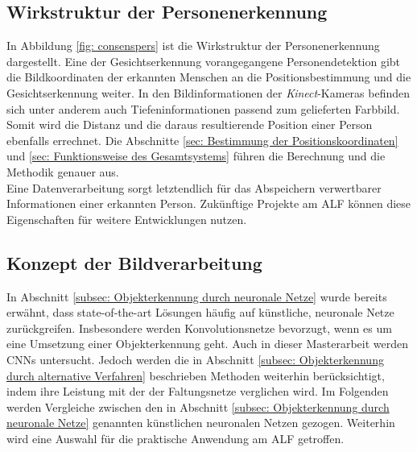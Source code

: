 	\subsection{Wirkstruktur der Personenerkennung}
	\label{subsec: Wirkstrukur Personenerkennung}
	In Abbildung \ref{fig: consenspers} ist die Wirkstruktur der Personenerkennung dargestellt. Eine der Gesichtserkennung vorangegangene Personendetektion gibt die Bildkoordinaten der erkannten Menschen an die Positionsbestimmung und die Gesichtserkennung weiter. In den Bildinformationen der \textit{Kinect}-Kameras befinden sich unter anderem auch Tiefeninformationen passend zum gelieferten Farbbild. Somit wird die Distanz und die daraus resultierende Position einer Person ebenfalls errechnet. Die Abschnitte \ref{sec: Bestimmung der Positionskoordinaten} und \ref{sec: Funktionsweise des Gesamtsystems} führen die Berechnung und die Methodik genauer aus.\\
		
	
	

		
	Eine Datenverarbeitung sorgt letztendlich für das Abspeichern verwertbarer Informationen einer erkannten Person. Zukünftige Projekte am ALF können diese Eigenschaften für weitere Entwicklungen nutzen.\\   
		
	\subsection{Konzept der Bildverarbeitung}
	\label{subsec: Auswahl und Training der verwendeten neuronalen Netze}
		
	In Abschnitt \ref{subsec: Objekterkennung durch neuronale Netze} wurde bereits erwähnt, dass state-of-the-art Lösungen häufig auf künstliche, neuronale Netze zurückgreifen. Insbesondere werden Konvolutionsnetze bevorzugt, wenn es um eine Umsetzung einer Objekterkennung geht. Auch in dieser Masterarbeit werden CNNs untersucht. Jedoch werden die in Abschnitt \ref{subsec: Objekterkennung durch alternative Verfahren} beschrieben Methoden weiterhin berücksichtigt, indem ihre Leistung mit der der Faltungsnetze verglichen wird. Im Folgenden werden Vergleiche zwischen den in Abschnitt \ref{subsec: Objekterkennung durch neuronale Netze} genannten künstlichen neuronalen Netzen gezogen. Weiterhin wird eine Auswahl für die praktische Anwendung am ALF getroffen. \\
		
		
		
